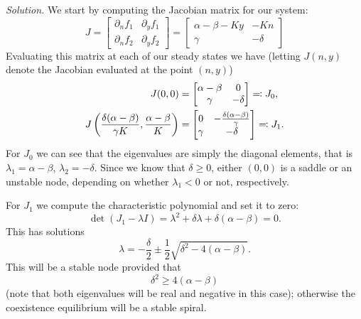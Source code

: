 \documentclass{article}
\begin{document}
\textit{Solution.}
We start by computing the Jacobian matrix for our system:
%
\begin{equation*}
    J =
    \begin{bmatrix}
        \partial_n f_1 & \partial_y f_1 \\
        \partial_n f_2 & \partial_y f_2
    \end{bmatrix}
    =
    \begin{bmatrix}
        \alpha - \beta - K y & - K n \\
        \gamma & - \delta
    \end{bmatrix}
\end{equation*}
%
Evaluating this matrix at each of our steady states we have
(letting $J(n, y)$ denote the Jacobian evaluated at the point
$(n, y)$)
%
\begin{align*}
    J(0, 0) &=
    \begin{bmatrix}
        \alpha - \beta & 0 \\
        \gamma & - \delta
    \end{bmatrix}
    \eqqcolon J_0
    ,
    \\
    J \del{
            \frac{\delta (\alpha - \beta)}{\gamma K},
            \frac{\alpha - \beta}{K}
        }
    &=
    \begin{bmatrix}
        0 & - \frac{\delta (\alpha - \beta)}{\gamma} \\
        \gamma & - \delta
    \end{bmatrix}
    \eqqcolon J_1
    .
\end{align*}
%
For $J_0$ we can see that the eigenvalues are simply the diagonal elements,
that is $\lambda_1 = \alpha - \beta$, $\lambda_2 = - \delta$. Since we
know that $\delta \geq 0$, either $(0, 0)$ is a saddle or an unstable node,
depending on whether $\lambda_1 < 0$ or not, respectively.

For $J_1$ we compute the characteristic polynomial and set it to zero:
%
\begin{equation*}
    \det(J_1 - \lambda I) = \lambda^2 + \delta \lambda + \delta (\alpha - \beta) = 0
    .
\end{equation*}
%
This has solutions
%
\begin{equation*}
    \lambda = - \frac{\delta}{2} \pm \frac{1}{2} \sqrt{\delta^2 - 4(\alpha - \beta)}
    .
\end{equation*}
%
This will be a stable node provided that
%
\begin{equation*}
    \delta^2 \geq 4 (\alpha - \beta)
\end{equation*}
%
(note that both eigenvalues will be real and negative in this case); otherwise
the coexistence equilibrium will be a stable spiral.
\end{document}
